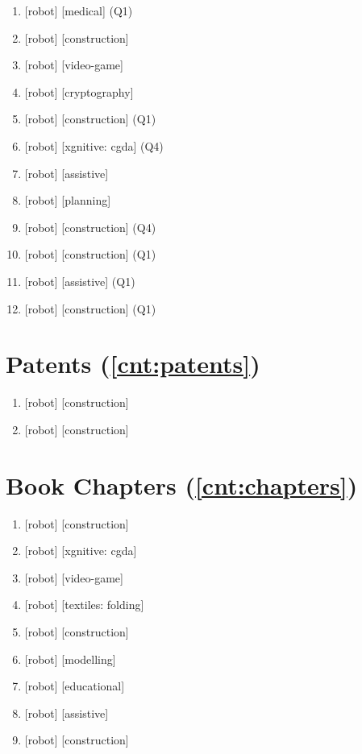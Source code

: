 \documentclass{article}
\begin{document}
\begin{enumerate}
  \item {} [robot] [medical] (Q1)
  \item {} [robot] [construction]
  \item {} [robot] [video-game]
  \item {} [robot] [cryptography]
  \item {} [robot] [construction] (Q1)
  \item {} [robot] [xgnitive: cgda] (Q4)
  \item {} [robot] [assistive]
  \item {} [robot] [planning]
  \item {} [robot] [construction] (Q4)
  \item {} [robot] [construction] (Q1)
  \item {} [robot] [assistive] (Q1)
  \item \label{cnt:journals}  [robot] [construction] (Q1)
\end{enumerate}

\section*{Patents (\ref*{cnt:patents})}
\begin{enumerate}
  \item {} [robot] [construction]
  \item \label{cnt:patents}  [robot] [construction]
\end{enumerate}

\section*{Book Chapters (\ref*{cnt:chapters})}
\begin{enumerate}
  \item {} [robot] [construction]
  \item {} [robot] [xgnitive: cgda]
  \item {} [robot] [video-game]
  \item {} [robot] [textiles: folding]
  \item {} [robot] [construction]
  \item {} [robot] [modelling]
  \item {} [robot] [educational]
  \item {} [robot] [assistive]
  \item \label{cnt:chapters}  [robot] [construction]
\end{enumerate}
\end{document}
